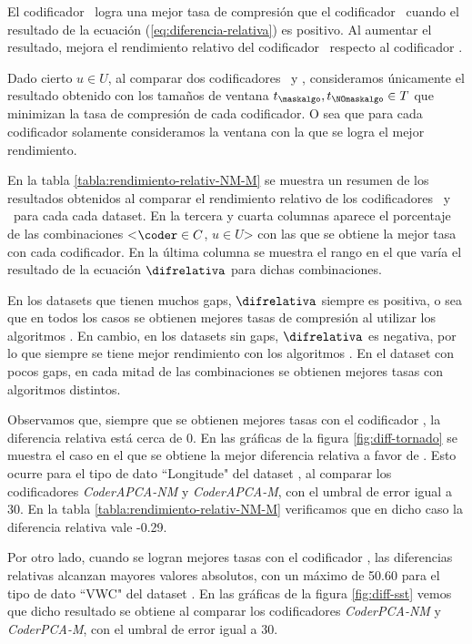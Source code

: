 El codificador \cmaskalgo \ logra una mejor tasa de compresión que el codificador \cNOmaskalgo \ cuando el resultado de la ecuación (\ref{eq:diferencia-relativa}) es positivo. Al aumentar el resultado, mejora el rendimiento relativo del codificador \cmaskalgo \ respecto al codificador \cNOmaskalgo.

Dado cierto $u \in U$, al comparar dos codificadores \cmaskalgo \ y \cNOmaskalgo, consideramos únicamente el resultado obtenido con los tamaños de ventana $t_\maskalgo, t_\NOmaskalgo \in T$ que minimizan la tasa de compresión de cada codificador. O sea que para cada codificador solamente consideramos la ventana con la que se logra el mejor rendimiento.

En la tabla \ref{tabla:rendimiento-relativ-NM-M} se muestra un resumen de los resultados obtenidos al comparar el rendimiento relativo de los codificadores \cNOmaskalgo \ y \cmaskalgo \ para cada cada dataset. En la tercera y cuarta columnas aparece el porcentaje de las combinaciones <$\coder \in C$, $u \in U$> con las que se obtiene la mejor tasa con cada codificador. En la última columna se muestra el rango en el que varía el resultado de la ecuación $\difrelativa$ para dichas combinaciones.

En los datasets que tienen muchos gaps, $\difrelativa$ siempre es positiva, o sea que en todos los casos se obtienen mejores tasas de compresión al utilizar los algoritmos \cmaskalgo. En cambio, en los datasets sin gaps, $\difrelativa$ es negativa, por lo que siempre se tiene mejor rendimiento con los algoritmos \cNOmaskalgo. En el dataset con pocos gaps, en cada mitad de las combinaciones se obtienen mejores tasas con algoritmos distintos.

\clearpage



Observamos que, siempre que se obtienen mejores tasas con el codificador \cNOmaskalgo, la diferencia relativa está cerca de 0. En las gráficas de la figura \ref{fig:diff-tornado} se muestra el caso en el que se obtiene la mejor diferencia relativa a favor de \cNOmaskalgo. Esto ocurre para el tipo de dato ``Longitude" del dataset \datasettornado, al comparar los codificadores \textit{CoderAPCA-NM} y \textit{CoderAPCA-M}, con el umbral de error igual a 30. En la tabla \ref{tabla:rendimiento-relativ-NM-M} verificamos que en dicho caso la diferencia relativa vale -0.29.

Por otro lado, cuando se logran mejores tasas con el codificador \cmaskalgo, las diferencias relativas alcanzan mayores valores absolutos, con un máximo de 50.60 para el tipo de dato ``VWC" del dataset \datasetsst. En las gráficas de la figura \ref{fig:diff-sst} vemos que dicho resultado se obtiene al comparar los codificadores \textit{CoderPCA-NM} y \textit{CoderPCA-M}, con el umbral de error igual a 30.

